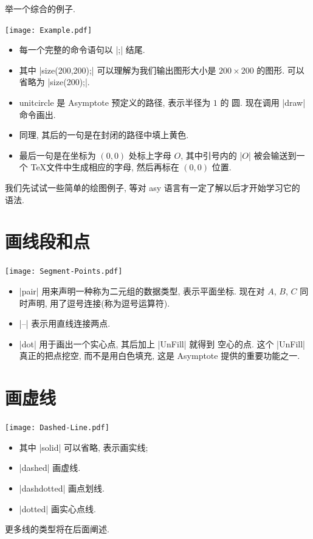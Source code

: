 \documentclass[nofonts,CJKnormalspaces]{ctexbook}
\begin{document}
举一个综合的例子.
\begin{center}\texttt{[image: Example.pdf]}\end{center}%

\begin{itemize}
\item 每一个完整的命令语句以 |;| 结尾.
\item 其中 |size(200,200);| 可以理解为我们输出图形大小是 $200\times 200$
  的图形. 可以省略为 |size(200);|.
\item {unitcircle} 是 Asymptote 预定义的路径, 表示半径为 $1$ 的
  圆. 现在调用 |draw| 命令画出.
\item 同理, 其后的一句是在封闭的路径中填上黄色.
\item 最后一句是在坐标为 $(0,0)$ 处标上字母 $O$, 其中引号内的 |$O$|
  被会输送到一个 \TeX 文件中生成相应的字母, 然后再标在 $(0,0)$ 位置.
\end{itemize}

我们先试试一些简单的绘图例子, 等对 asy 语言有一定了解以后才开始学习它的
语法.

\section{画线段和点}
\begin{center}\texttt{[image: Segment-Points.pdf]}\end{center}%

\begin{itemize}
\item |pair| 用来声明一种称为二元组的数据类型, 表示平面坐标. 现在对 $A$,
  $B$, $C$ 同时声明, 用了逗号连接(称为逗号运算符).
\item |--| 表示用直线连接两点.
\item |dot| 用于画出一个实心点, 其后加上 |UnFill| 就得到
  空心的点. 这个 |UnFill| 真正的把点挖空, 而不是用白色填充, 这是
  Asymptote 提供的重要功能之一.
\end{itemize}

\section{画虚线}
\begin{center}\texttt{[image: Dashed-Line.pdf]}\end{center}%

\begin{itemize}
\item  其中 |solid| 可以省略, 表示画实线;
\item |dashed| 画虚线.
\item |dashdotted| 画点划线.
\item |dotted| 画实心点线.
\end{itemize}
更多线的类型将在后面阐述.
\end{document}
